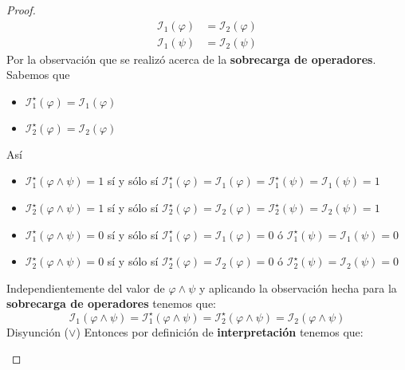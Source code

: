 \documentclass[a4paper]{article}
\begin{document}
\begin{proof}
\begin{align*}
        \mathcal{I}_1(\varphi) &= \mathcal{I}_2(\varphi) \\
        \mathcal{I}_1(\psi) &= \mathcal{I}_2(\psi)
    \end{align*}
    Por la observación que se realizó acerca de la \textbf{sobrecarga de operadores}. Sabemos que 
    \begin{itemize}
        \item \(\mathcal{I}^{\star}_{1}\left(\varphi\right) = \mathcal{I}_{1}\left(\varphi\right)\)
        \item \(\mathcal{I}^{\star}_{2}\left(\varphi\right) = \mathcal{I}_{2}\left(\varphi\right)\)
    \end{itemize}
    Así
    \begin{itemize}
        \item \(\mathcal{I}^{\star}_{1}\left(\varphi \land \psi\right) = 1\) sí y sólo sí \(\mathcal{I}^{\star}_{1}\left( \varphi\right) = \mathcal{I}_{1}\left( \varphi\right) = \mathcal{I}^{\star}_{1}\left( \psi\right) = \mathcal{I}_{1}\left( \psi\right) = 1\)
        \item \(\mathcal{I}^{\star}_{2}\left(\varphi \land \psi\right) = 1\) sí y sólo sí \(\mathcal{I}^{\star}_{2}\left( \varphi\right) = \mathcal{I}_{2}\left( \varphi\right) =  \mathcal{I}^{\star}_{2}\left( \psi\right) = \mathcal{I}_{2}\left( \psi\right) = 1\)
        \item \(\mathcal{I}^{\star}_{1}\left(\varphi \land \psi\right) = 0\) sí y sólo sí \(\mathcal{I}^{\star}_{1}\left( \varphi\right) = \mathcal{I}_{1}\left( \varphi\right) = 0\) ó \(\mathcal{I}^{\star}_{1}\left( \psi\right) = \mathcal{I}_{1}\left( \psi \right) = 0\)
        \item \(\mathcal{I}^{\star}_{2}\left(\varphi \land \psi\right) = 0\) sí y sólo sí \(\mathcal{I}^{\star}_{2}\left( \varphi\right) = \mathcal{I}_{2}\left( \varphi\right) = 0\) ó \(\mathcal{I}^{\star}_{2}\left( \psi\right) = \mathcal{I}_{2}\left( \psi \right) = 0\) 
    \end{itemize}
    Independientemente del valor de \(\varphi \land \psi\) y aplicando la observación hecha para la \textbf{sobrecarga de operadores} tenemos que:
    \[
        \mathcal{I}_{1}\left(\varphi \land \psi\right) = \mathcal{I}^{\star}_{1}\left(\varphi \land \psi\right) = \mathcal{I}^{\star}_{2}\left(\varphi \land \psi\right) = \mathcal{I}_{2}\left(\varphi \land \psi\right)
    \] 
    Disyunción (\(\lor\))
    \newline
    Entonces por definición de \textbf{interpretación} tenemos que:
    \begin{itemize}

\end{itemize}
\end{proof}
\end{document}
